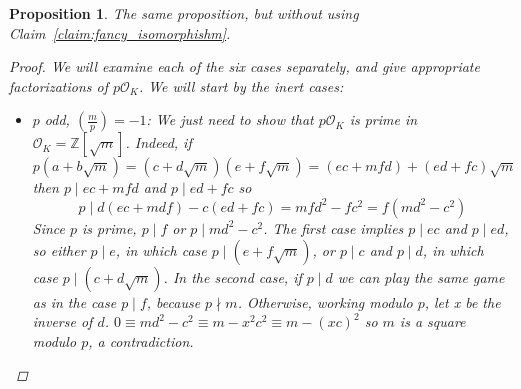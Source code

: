 \documentclass[11pt]{article}
\newtheorem{prop}{Proposition}
\theoremstyle{definition}
\begin{document}
    \begin{prop}
        The same proposition, but without using Claim~\ref{claim:fancy_isomorphishm}.
        \begin{proof}
            We will examine each of the six cases separately, and give appropriate factorizations of $p\mathcal{O}_K$.
            We will start by the inert cases:
            \begin{itemize}

                \item $p$ odd, $\left( \frac{m}{p} \right) = -1$: We just need to show that $p \mathcal{O}_K$ is prime in $\mathcal{O}_K = \mathbb{Z}\left[\sqrt {m}\right]$.
                Indeed, if \[p\left(a+b\sqrt {m}\right) = \left(c+d\sqrt{m}\right)\left(e+f\sqrt{m}\right) = (ec + mfd) + (ed + fc)\sqrt{m}\]
                then $p \mid ec + mfd$ and $p \mid ed + fc$ so
                \[p \mid d(ec+mdf) - c(ed+fc) = mfd^2 - fc^2 = f(md^2 - c^2)\]
                Since $p$ is prime, $p \mid f$ or $p \mid md^2 - c^2$.
                The first case implies $p \mid ec$ and $p \mid ed$, so either $p \mid e$,
                in which case $p \mid \left(e + f \sqrt {m}\right)$, or $p \mid c$ and $p \mid d$,
                in which case $p \mid \left( c + d \sqrt {m} \right)$.
                In the second case, if $p \mid d$ we can play the same game as in the case $p \mid f$, because $p \nmid m$.
                Otherwise, working modulo $p$, let x be the inverse of $d$.
                $0 \equiv md^2-c^2 \equiv m - x^2c^2 \equiv m - (xc)^2$ so $m$ is a square modulo $p$, a contradiction.


\end{itemize}
\end{proof}
\end{prop}
\end{document}

